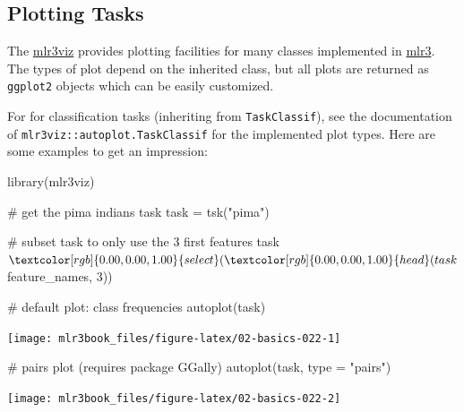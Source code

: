 \documentclass[
  11pt,
  parskip=half,
  DIV=calc,
  BCOR=10mm,
  x11names]{scrbook}
\newenvironment{Shaded}{}{}
\newcommand{\CommentTok}[1]{\textcolor[rgb]{0.00,0.50,0.00}{#1}}
\newcommand{\DataTypeTok}[1]{#1}
\newcommand{\DecValTok}[1]{#1}
\newcommand{\KeywordTok}[1]{\textcolor[rgb]{0.00,0.00,1.00}{#1}}
\newcommand{\NormalTok}[1]{#1}
\newcommand{\OperatorTok}[1]{#1}
\newcommand{\StringTok}[1]{\textcolor[rgb]{0.00,0.50,0.50}{#1}}
\begin{document}
\hypertarget{autoplot-task}{%
\subsection{Plotting Tasks}\label{autoplot-task}}

The \href{https://mlr3viz.mlr-org.com}{mlr3viz} provides plotting facilities for many classes implemented in \href{https://mlr3.mlr-org.com}{mlr3}.
The types of plot depend on the inherited class, but all plots are returned as \texttt{ggplot2} objects which can be easily customized.

For for classification tasks (inheriting from \texttt{TaskClassif}), see the documentation of \texttt{mlr3viz::autoplot.TaskClassif} for the implemented plot types.
Here are some examples to get an impression:

\begin{Shaded}
\begin{Highlighting}[]
\KeywordTok{library}\NormalTok{(mlr3viz)}

\CommentTok{# get the pima indians task}
\NormalTok{task =}\StringTok{ }\KeywordTok{tsk}\NormalTok{(}\StringTok{"pima"}\NormalTok{)}

\CommentTok{# subset task to only use the 3 first features}
\NormalTok{task}\OperatorTok{$}\KeywordTok{select}\NormalTok{(}\KeywordTok{head}\NormalTok{(task}\OperatorTok{$}\NormalTok{feature_names, }\DecValTok{3}\NormalTok{))}

\CommentTok{# default plot: class frequencies}
\KeywordTok{autoplot}\NormalTok{(task)}
\end{Highlighting}
\end{Shaded}

\begin{center}\texttt{[image: mlr3book\_files/figure-latex/02-basics-022-1]} \end{center}

\begin{Shaded}
\begin{Highlighting}[]

\CommentTok{# pairs plot (requires package GGally)}
\KeywordTok{autoplot}\NormalTok{(task, }\DataTypeTok{type =} \StringTok{"pairs"}\NormalTok{)}
\end{Highlighting}
\end{Shaded}

\begin{center}\texttt{[image: mlr3book\_files/figure-latex/02-basics-022-2]} \end{center}
\end{document}
